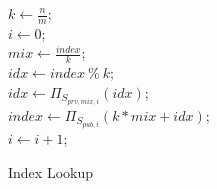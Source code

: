 \documentclass{llncs}
\begin{document}
\begin{figure}
\centering
\begin{minipage}{0.5\textwidth}
\begin{algorithm}[H]
\DontPrintSemicolon
{}
$k \gets \frac{n}{m}$;\\
$i \gets 0$;\\
{
	$mix \gets \frac{index}{k} $;\\
	$idx \gets index\ \%\ k$;\\
	$idx \gets {\Pi}_{S_{prv, mix, i}}(idx) $;\\
	$index \gets {\Pi}_{S_{pub, i}}(k*mix+idx)$;\\
	$i\gets i+1$;
}
\caption{Index Lookup}
\label{alg:IAS}
\end{algorithm}
\end{minipage}
\end{figure}
\end{document}

